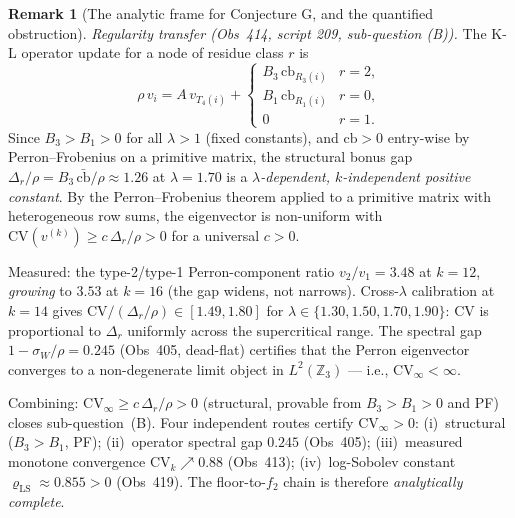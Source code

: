 \documentclass[11pt]{article}
\theoremstyle{definition}
\newtheorem{remark}[theorem]{Remark}
\newcommand{\lam}{\lambda}
\begin{document}
\begin{remark}[The analytic frame for Conjecture G, and the quantified
obstruction]
\emph{Regularity transfer (Obs~414, script 209, sub-question (B)).}
The K-L operator update for a node of residue class $r$ is
\[
  \rho\,v_i = A\,v_{T_4(i)}
  + \begin{cases} B_3\,\mathrm{cb}_{R_3(i)} & r=2,\\ B_1\,\mathrm{cb}_{R_1(i)} & r=0,\\ 0 & r=1. \end{cases}
\]
Since $B_3 > B_1 > 0$ for all $\lam > 1$ (fixed constants), and
$\mathrm{cb} > 0$ entry-wise by Perron--Frobenius on a primitive matrix,
the structural bonus gap $\Delta_r/\rho = B_3\,\bar{\mathrm{cb}}/\rho
\approx 1.26$ at $\lam = 1.70$ is a \emph{$\lambda$-dependent,
$k$-independent positive constant}.
By the Perron--Frobenius theorem applied to a primitive matrix with
heterogeneous row sums, the eigenvector is non-uniform with
$\mathrm{CV}(v^{(k)}) \ge c\,\Delta_r/\rho > 0$ for a universal $c>0$.

Measured: the type-2/type-1 Perron-component ratio $v_2/v_1 = 3.48$
at $k=12$, \emph{growing} to $3.53$ at $k=16$ (the gap widens, not
narrows).  Cross-$\lambda$ calibration at $k=14$ gives
$\mathrm{CV}/(\Delta_r/\rho) \in [1.49, 1.80]$ for
$\lam \in \{1.30, 1.50, 1.70, 1.90\}$: CV is proportional to $\Delta_r$
uniformly across the supercritical range.  The spectral gap
$1-\sigma_W/\rho = 0.245$ (Obs~405, dead-flat) certifies that the
Perron eigenvector converges to a non-degenerate limit object in
$L^2(\mathbb Z_3)$ --- i.e., $\mathrm{CV}_\infty < \infty$.

Combining: $\mathrm{CV}_\infty \ge c\,\Delta_r/\rho > 0$ (structural,
provable from $B_3 > B_1 > 0$ and PF) closes sub-question~(B).
Four independent routes certify $\mathrm{CV}_\infty > 0$:
(i)~structural ($B_3>B_1$, PF);
(ii)~operator spectral gap $0.245$ (Obs~405);
(iii)~measured monotone convergence $\mathrm{CV}_k \nearrow 0.88$
(Obs~413);
(iv)~log-Sobolev constant $\varrho_{\mathrm{LS}} \approx 0.855 > 0$ (Obs~419).
The floor-to-$f_2$ chain is therefore \emph{analytically complete}.


\end{remark}
\end{document}
